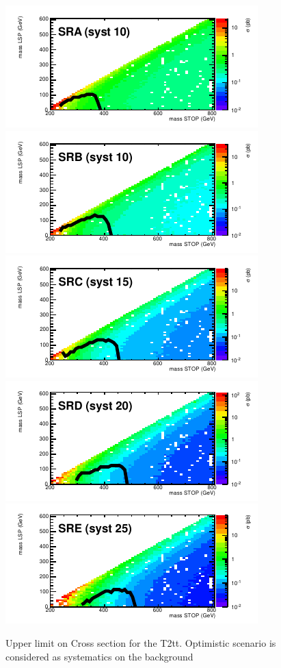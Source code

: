 \begin{figure}[hbt]
  \begin{center}
        \includegraphics[width=0.5\linewidth]{plots/stopPlot/masses_SRA_xsecO.pdf}%
        \includegraphics[width=0.5\linewidth]{plots/stopPlot/masses_SRB_xsecO.pdf}
        \includegraphics[width=0.5\linewidth]{plots/stopPlot/masses_SRC_xsecO.pdf}%
        \includegraphics[width=0.5\linewidth]{plots/stopPlot/masses_SRD_xsecO.pdf}
        \includegraphics[width=0.5\linewidth]{plots/stopPlot/masses_SRE_xsecO.pdf}%
    \caption{Upper limit on Cross section for the T2tt. Optimistic scenario is considered as systematics on the background}
\label{fig:SigEff}
      \end{center}
\end{figure}

